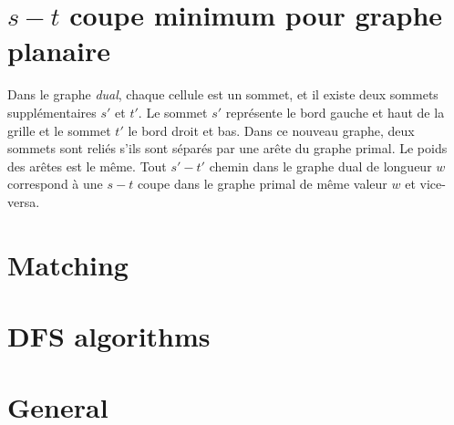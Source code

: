 \section{$s-t$ coupe minimum pour graphe planaire}
    Dans le graphe \emph{dual}, chaque cellule est un sommet, et il existe deux sommets supplémentaires $s'$ et $t'$. Le sommet $s'$ représente le bord gauche et haut de la grille et le sommet $t'$ le bord droit et bas. Dans ce nouveau graphe, deux sommets sont reliés s'ils sont séparés par une arête du graphe primal. Le poids des arêtes est le même.
    Tout $s'-t'$ chemin dans le graphe dual de longueur $w$ correspond à une $s-t$ coupe dans le graphe primal de même valeur $w$ et vice-versa.

\section{Matching}

\section{DFS algorithms}

\section{General}
